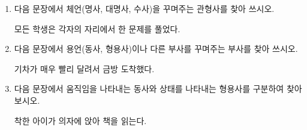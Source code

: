 \documentclass[fs9,seriesRus]{korfarm-base}
\begin{document}
\begin{enumerate}[leftmargin=22pt, itemsep=6pt, topsep=4pt, label=\textbf{\arabic*.}]
\item 다음 문장에서 체언(명사, 대명사, 수사)을 꾸며주는 관형사를 찾아 쓰시오.
\begin{kfEvidence}모든 학생은 각자의 자리에서 한 문제를 풀었다.\end{kfEvidence}
\item 다음 문장에서 용언(동사, 형용사)이나 다른 부사를 꾸며주는 부사를 찾아 쓰시오.
\begin{kfEvidence}기차가 매우 빨리 달려서 금방 도착했다.\end{kfEvidence}
\item 다음 문장에서 움직임을 나타내는 동사와 상태를 나타내는 형용사를 구분하여 찾아보시오.
\begin{kfEvidence}착한 아이가 의자에 앉아 책을 읽는다.\end{kfEvidence}
\end{enumerate}

\end{document}
